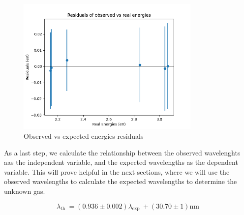 \begin{figure}
    \centering
    \includegraphics[width=0.8\textwidth]{Results/Sections/Part1/Part1_energy_observed_vs_expected_residuals.png}
    \caption{Observed vs expected energies residuals}
    \label{fig:Part1energyU}
\end{figure}

As a last step, we calculate the relationship between the observed wavelenghts aas the independent variable, and the expected wavelengths as the dependent variable.
This will prove helpful in the next sections, where we will use the observed wavelengths to calculate the expected wavelengths to determine the unknown gas.

\begin{equation}
    \lambda_{\text {th }} = (0.936 \pm 0.002) \lambda_{\text {exp }} + (30.70 \pm 1) \text{nm}
\end{equation}


